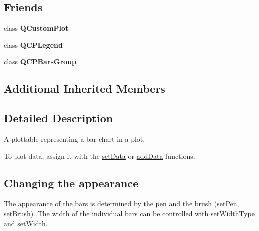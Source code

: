 \subsection*{Friends}
\begin{DoxyCompactItemize}
\item 
class {\bfseries Q\+Custom\+Plot}\hypertarget{class_q_c_p_bars_a1cdf9df76adcfae45261690aa0ca2198}{}\label{class_q_c_p_bars_a1cdf9df76adcfae45261690aa0ca2198}

\item 
class {\bfseries Q\+C\+P\+Legend}\hypertarget{class_q_c_p_bars_a8429035e7adfbd7f05805a6530ad5e3b}{}\label{class_q_c_p_bars_a8429035e7adfbd7f05805a6530ad5e3b}

\item 
class {\bfseries Q\+C\+P\+Bars\+Group}\hypertarget{class_q_c_p_bars_ae1051b4d58a2786cb420367a586e2fee}{}\label{class_q_c_p_bars_ae1051b4d58a2786cb420367a586e2fee}

\end{DoxyCompactItemize}
\subsection*{Additional Inherited Members}


\subsection{Detailed Description}
A plottable representing a bar chart in a plot. 



To plot data, assign it with the \hyperlink{class_q_c_p_bars_aa3435aab19e0a49e4e7b41bd36a8d96b}{set\+Data} or \hyperlink{class_q_c_p_bars_a1f29cf08615040993209147fa68de3f2}{add\+Data} functions.\hypertarget{class_q_c_p_statistical_box_appearance}{}\subsection{Changing the appearance}\label{class_q_c_p_statistical_box_appearance}
The appearance of the bars is determined by the pen and the brush (\hyperlink{class_q_c_p_abstract_plottable_ab74b09ae4c0e7e13142fe4b5bf46cac7}{set\+Pen}, \hyperlink{class_q_c_p_abstract_plottable_a7a4b92144dca6453a1f0f210e27edc74}{set\+Brush}). The width of the individual bars can be controlled with \hyperlink{class_q_c_p_bars_adcaa3b41281bb2c0f7949b341592fcc0}{set\+Width\+Type} and \hyperlink{class_q_c_p_bars_afec6116579d44d5b706e0fa5e5332507}{set\+Width}.

